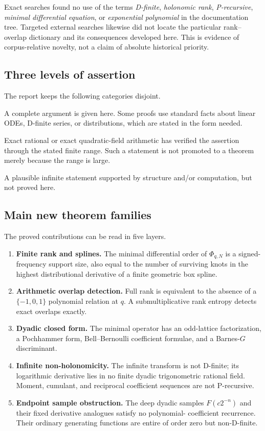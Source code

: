 \documentclass[11pt]{article}
\numberwithin{equation}{section}
\theoremstyle{definition}
\theoremstyle{remark}
\newcommand{\provedtag}{\textsc{proved}}
\newcommand{\computedtag}{\textsc{exact computation}}
\newcommand{\conjtag}{\textsc{conjectural}}
\begin{document}
Exact searches found no use of the terms \emph{D-finite}, \emph{holonomic
rank}, \emph{P-recursive}, \emph{minimal differential equation}, or
\emph{exponential polynomial} in the documentation tree.  Targeted external
searches likewise did not locate the particular rank--overlap dictionary and
its consequences developed here.  This is evidence of corpus-relative
novelty, not a claim of absolute historical priority.

\subsection{Three levels of assertion}

The report keeps the following categories disjoint.
\begin{description}[style=nextline,leftmargin=2.8cm]
  \item[\provedtag] A complete argument is given here.  Some proofs use standard
  facts about linear ODEs, D-finite series, or distributions, which are stated
  in the form needed.
  \item[\computedtag] Exact rational or exact quadratic-field arithmetic has
  verified the assertion through the stated finite range.  Such a statement is
  not promoted to a theorem merely because the range is large.
  \item[\conjtag] A plausible infinite statement supported by structure and/or
  computation, but not proved here.
\end{description}

\subsection{Main new theorem families}

The proved contributions can be read in five layers.
\begin{enumerate}
  \item \textbf{Finite rank and splines.}  The minimal differential order of
  $\Phi_{q,N}$ is a signed-frequency support size, also equal to the number of
  surviving knots in the highest distributional derivative of a finite
  geometric box spline.
  \item \textbf{Arithmetic overlap detection.}  Full rank is equivalent to the
  absence of a $\{-1,0,1\}$ polynomial relation at $q$.  A submultiplicative
  rank entropy detects exact overlaps exactly.
  \item \textbf{Dyadic closed form.}  The minimal operator has an odd-lattice
  factorization, a Pochhammer form, Bell--Bernoulli coefficient formulae, and a
  Barnes-$G$ discriminant.
  \item \textbf{Infinite non-holonomicity.}  The infinite transform is not
  D-finite; its logarithmic derivative lies in no finite dyadic trigonometric
  rational field.  Moment, cumulant, and reciprocal coefficient sequences are
  not P-recursive.
  \item \textbf{Endpoint sample obstruction.}  The deep dyadic samples
  $F(c2^{-n})$ and their fixed derivative analogues satisfy no polynomial-
  coefficient recurrence.  Their ordinary generating functions are entire of
  order zero but non-D-finite.
\end{enumerate}
\end{document}
